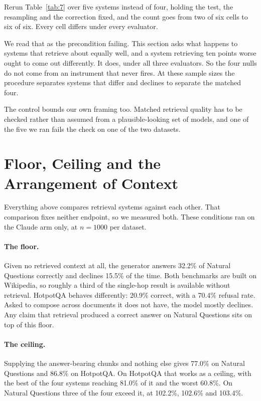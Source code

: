 \documentclass[11pt]{article}
\begin{document}
Rerun Table~\ref{tab:7} over five systems instead of four, holding the test, the resampling and the correction fixed, and the count goes from two of six cells to six of six. Every cell differs under every evaluator.

We read that as the precondition failing. This section asks what happens to systems that retrieve about equally well, and a system retrieving ten points worse ought to come out differently. It does, under all three evaluators. So the four nulls do not come from an instrument that never fires. At these sample sizes the procedure separates systems that differ and declines to separate the matched four.

The control bounds our own framing too. Matched retrieval quality has to be checked rather than assumed from a plausible-looking set of models, and one of the five we ran fails the check on one of the two datasets.

\section{Floor, Ceiling and the Arrangement of Context}
\label{sec:anchors}

Everything above compares retrieval systems against each other. That comparison fixes neither endpoint, so we measured both. These conditions ran on the Claude arm only, at $n = 1000$ per dataset.

\paragraph{The floor.} Given no retrieved context at all, the generator answers 32.2\% of Natural Questions correctly and declines 15.5\% of the time. Both benchmarks are built on Wikipedia, so roughly a third of the single-hop result is available without retrieval. HotpotQA behaves differently: 20.9\% correct, with a 70.4\% refusal rate. Asked to compose across documents it does not have, the model mostly declines. Any claim that retrieval produced a correct answer on Natural Questions sits on top of this floor.

\paragraph{The ceiling.} Supplying the answer-bearing chunks and nothing else gives 77.0\% on Natural Questions and 86.8\% on HotpotQA. On HotpotQA that works as a ceiling, with the best of the four systems reaching 81.0\% of it and the worst 60.8\%. On Natural Questions three of the four exceed it, at 102.2\%, 102.6\% and 103.4\%.
\end{document}
